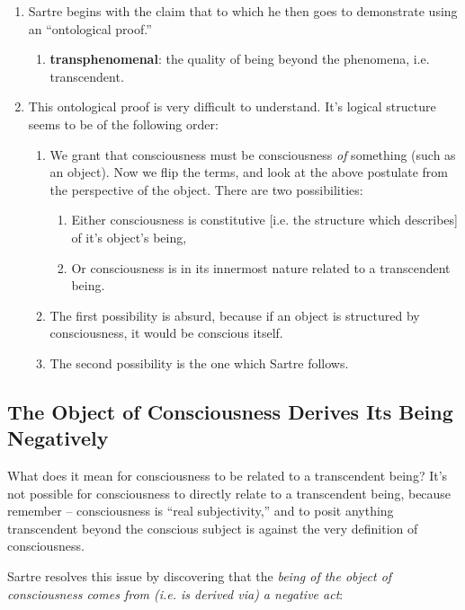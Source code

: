 \begin{enumerate}
  \item Sartre begins with the claim that  to which he then goes to demonstrate using an \enquote{ontological proof.}
  \begin{enumerate}
    \item \textbf{transphenomenal}: the quality of being beyond the phenomena, i.e. transcendent.
  \end{enumerate}
  \item This ontological proof is very difficult to understand. It's logical structure seems to be of the following order:
  \begin{enumerate}
    \item We grant that consciousness must be consciousness \emph{of} something (such as an object). Now we flip the terms, and look at the above postulate from the perspective of the object. There are two possibilities:
    \begin{enumerate}
      \item Either consciousness is constitutive [i.e. the structure which describes] of it's object's being,
      \item Or consciousness is in its innermost nature related to a transcendent being.
    \end{enumerate}
    \item The first possibility is absurd, because if an object is structured by consciousness, it would be conscious itself.
    \item The second possibility is the one which Sartre follows.
  \end{enumerate}
\end{enumerate}

\subsection{The Object of Consciousness Derives Its Being Negatively}
What does it mean for consciousness to be related to a transcendent being? It's not possible for consciousness to directly relate to a transcendent being, because remember -- consciousness is \enquote{real subjectivity,} and to posit anything transcendent beyond the conscious subject is against the very definition of consciousness.

\noindent
Sartre resolves this issue by discovering that the \emph{being of the object of consciousness comes from (i.e. is derived via) a negative act}:

